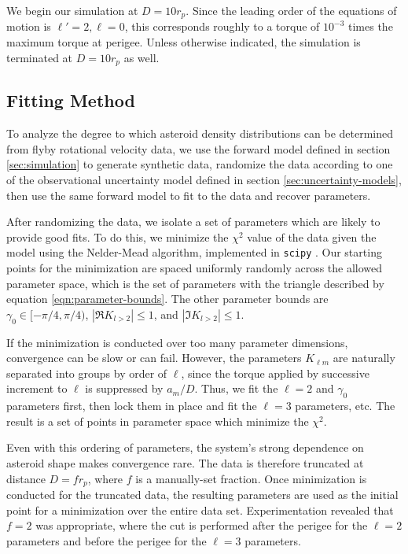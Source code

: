 \documentclass{aastex631}
\begin{document}
We begin our simulation at $D = 10 r_p$. Since the leading order of the equations of motion is $\ell' = 2, \ell = 0$, this corresponds roughly to a torque of $10^{-3}$ times the maximum torque at perigee. Unless otherwise indicated, the simulation is terminated at $D=10 r_p$ as well.


\subsection{Fitting Method}
\label{sec:fitting-method}
To analyze the degree to which asteroid density distributions can be determined from flyby rotational velocity data, we use the forward model defined in section \ref{sec:simulation} to generate synthetic data, randomize the data according to one of the observational uncertainty model defined in section \ref{sec:uncertainty-models}, then use the same forward model to fit to the data and recover parameters.

After randomizing the data, we isolate a set of parameters which are likely to provide good fits. To do this, we minimize the $\chi^2$ value of the data given the model using the Nelder-Mead algorithm, implemented in \texttt{scipy} \cite{NelderMead}. Our starting points for the minimization are spaced uniformly randomly across the allowed parameter space, which is the set of parameters with the triangle described by equation \ref{eqn:parameter-bounds}. The other parameter bounds are $\gamma_0 \in [-\pi/4, \pi/4)$, $|\Re K_{l>2}| \leq 1$, and $|\Im K_{l>2}| \leq  1$.

If the minimization is conducted over too many parameter dimensions, convergence can be slow or can fail. However, the parameters $K_{\ell m}$ are naturally separated into groups by order of $\ell$, since the torque applied by successive increment to $\ell$ is suppressed by $a_m/D$. Thus, we fit the $\ell=2$ and $\gamma_0$ parameters first, then lock them in place and fit the $\ell=3$ parameters, etc. The result is a set of points in parameter space which minimize the $\chi^2$.

Even with this ordering of parameters, the system's strong dependence on asteroid shape makes convergence rare. The data is therefore truncated at distance $D = f r_p$, where $f$ is a manually-set fraction. Once minimization is conducted for the truncated data, the resulting parameters are used as the initial point for a minimization over the entire data set. Experimentation revealed that $f=2$ was appropriate, where the cut is performed after the perigee for the $\ell = 2$ parameters and before the perigee for the $\ell = 3$ parameters.
\end{document}
